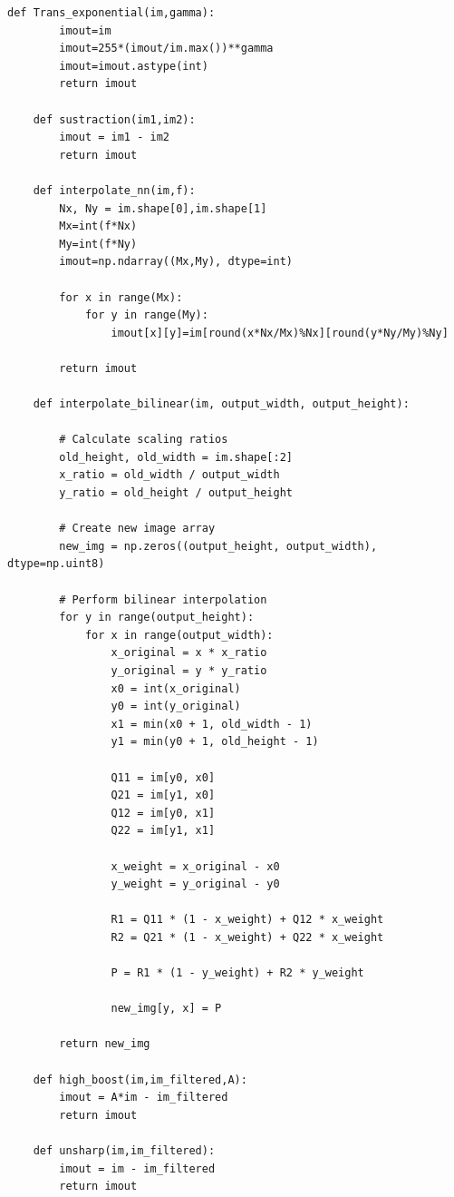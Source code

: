 \documentclass[11pt,twocolumn,twoside]{opticajnl}
\begin{document}
\begin{onecolumn}
\begin{lstlisting}[style=mystyle]
    def Trans_exponential(im,gamma):
        imout=im
        imout=255*(imout/im.max())**gamma
        imout=imout.astype(int)
        return imout
    
    def sustraction(im1,im2):
        imout = im1 - im2
        return imout
    
    def interpolate_nn(im,f):
        Nx, Ny = im.shape[0],im.shape[1]
        Mx=int(f*Nx)
        My=int(f*Ny)
        imout=np.ndarray((Mx,My), dtype=int)
    
        for x in range(Mx):
            for y in range(My):
                imout[x][y]=im[round(x*Nx/Mx)%Nx][round(y*Ny/My)%Ny]
    
        return imout
    
    def interpolate_bilinear(im, output_width, output_height):
    
        # Calculate scaling ratios
        old_height, old_width = im.shape[:2]
        x_ratio = old_width / output_width
        y_ratio = old_height / output_height
    
        # Create new image array
        new_img = np.zeros((output_height, output_width), dtype=np.uint8)
    
        # Perform bilinear interpolation
        for y in range(output_height):
            for x in range(output_width):
                x_original = x * x_ratio
                y_original = y * y_ratio
                x0 = int(x_original)
                y0 = int(y_original)
                x1 = min(x0 + 1, old_width - 1)
                y1 = min(y0 + 1, old_height - 1)
    
                Q11 = im[y0, x0]
                Q21 = im[y1, x0]
                Q12 = im[y0, x1]
                Q22 = im[y1, x1]
    
                x_weight = x_original - x0
                y_weight = y_original - y0
    
                R1 = Q11 * (1 - x_weight) + Q12 * x_weight
                R2 = Q21 * (1 - x_weight) + Q22 * x_weight
    
                P = R1 * (1 - y_weight) + R2 * y_weight
    
                new_img[y, x] = P
    
        return new_img
    
    def high_boost(im,im_filtered,A):
        imout = A*im - im_filtered
        return imout
    
    def unsharp(im,im_filtered):
        imout = im - im_filtered
        return imout
    

\end{lstlisting}
\end{onecolumn}
\end{document}
